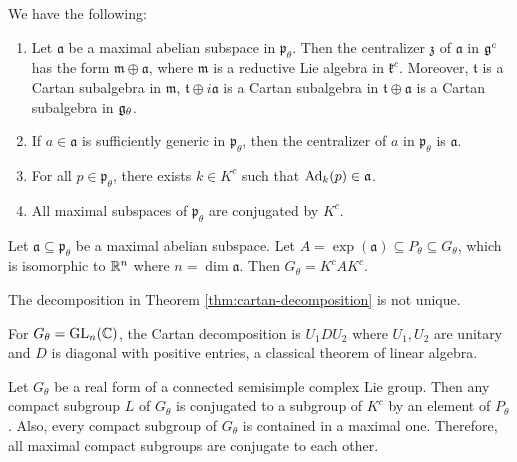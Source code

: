 \begin{prop}
  We have the following:
  \begin{enumerate}
    \item Let $\mathfrak{a}$ be a maximal abelian subspace
      in $\mathfrak{p}_\theta$. Then
      the centralizer $\mathfrak{z}$
      of $\mathfrak{a}$ in $\mathfrak{g}^c$
      has the form $\mathfrak{m} \oplus \mathfrak{a}$,
      where $\mathfrak{m}$ is a reductive
      Lie algebra in $\mathfrak{k}^c$.
      Moreover, $\mathfrak{t}$ is
      a Cartan subalgebra in
      $\mathfrak{m}$,
      $\mathfrak{t} \oplus i \mathfrak{a}$
      is a Cartan subalgebra in
      $\mathfrak{t} \oplus \mathfrak{a}$
      is a Cartan subalgebra in $\mathfrak{g}_\theta$.
    \item If $a \in \mathfrak{a}$ is
      sufficiently generic in
      $\mathfrak{p}_\theta$, then the
      centralizer of $a$ in
      $\mathfrak{p}_\theta$ is
      $\mathfrak{a}$.
    \item For all $p \in \mathfrak{p}_\theta$,
      there exists $k \in K^c$ such that
      $\operatorname{Ad}_k(p) \in \mathfrak{a}$.
    \item All maximal subspaces of
      $\mathfrak{p}_\theta$ are conjugated
      by $K^c$.
  \end{enumerate}
\end{prop}

\begin{theorem}\label{thm:cartan-decomposition}
  Let $\mathfrak{a} \subseteq \mathfrak{p}_\theta$
  be a maximal abelian subspace. Let
  $A = \exp(\mathfrak{a}) \subseteq P_\theta \subseteq G_\theta$,
  which is isomorphic to
  $\mathbb{R}^n$ where $n = \dim \mathfrak{a}$.
  Then $G_\theta = K^c A K^c$.
\end{theorem}

\begin{remark}
  The decomposition in Theorem
  \ref{thm:cartan-decomposition}
  is not unique.
\end{remark}

\begin{remark}
  For $G_\theta = \operatorname{GL}_n(\mathbb{C})$, the
  Cartan decomposition is $U_1 D U_2$
  where $U_1, U_2$ are unitary and
  $D$ is diagonal with positive
  entries, a classical theorem of linear
  algebra.
\end{remark}

\begin{theorem}[E. Cartan]
  Let $G_\theta$ be a real form of a
  connected semisimple complex Lie group.
  Then any compact subgroup $L$ of
  $G_\theta$ is conjugated to a subgroup of $K^c$
  by an element of $P_\theta$. Also,
  every compact subgroup of $G_\theta$
  is contained in a maximal one.
  Therefore, all maximal compact subgroups
  are conjugate to each other.
\end{theorem}
